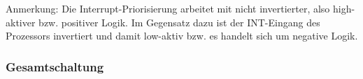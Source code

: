 Anmerkung: Die Interrupt-Priorisierung arbeitet mit nicht invertierter, also high-aktiver bzw. positiver Logik. Im Gegensatz dazu ist der INT-Eingang des Prozessors invertiert und damit low-aktiv bzw. es handelt sich um negative Logik.

\subsubsection{Gesamtschaltung}
\begin{figure}[H]
    \centering
    \qquad
    \qquad
\end{figure}
